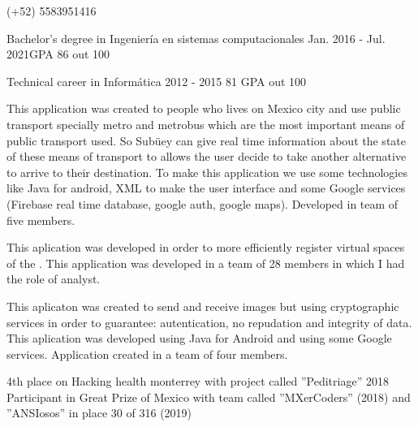 \documentclass{resume}
\begin{document}
{}
{}
{(+52) 5583951416}

{Bachelor's degree in Ingeniería en sistemas computacionales}
{Jan. 2016 - Jul. 2021}{GPA 86 out 100}\break

{Technical career in Informática}
{2012 - 2015} 
{81 GPA out 100}

{This application was created to people who lives on Mexico city and use public transport specially metro and metrobus which are the most important means of public transport used. So Subüey can give real time information about the state of these means of transport to allows the user decide to take another alternative to arrive to their destination. To make this application we use some technologies like Java for android, XML to make the user interface and some Google services (Firebase real time database, google auth, google maps). Developed in team of five members.}

{This aplication was developed in order to more efficiently register virtual spaces of the . This application was developed in a team of 28 members in which I had the role of analyst.}

{This aplicaton was created to send and receive images but using cryptographic services in order to guarantee: autentication, no repudation and integrity of data. This aplication was developed using Java for Android and using some Google services. Application created in a team of four members.}

{4th place on Hacking health monterrey with project called ''Peditriage''}
{2018}
{Participant in Great Prize of Mexico with team called ''MXerCoders'' (2018) and ''ANSIosos'' in place 30 of 316 (2019)}
{}
\end{document}
